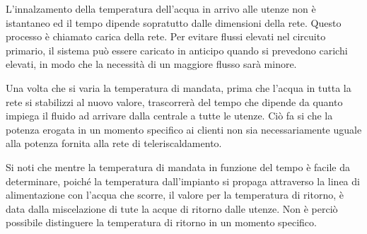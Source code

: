 \documentclass[laurea,oneside,11pt]{USiena_tesiLM3}
\begin{document}
L'innalzamento della temperatura dell'acqua in arrivo alle utenze non è istantaneo ed il tempo dipende sopratutto dalle dimensioni della rete. Questo processo è chiamato carica della rete. Per evitare flussi elevati nel circuito primario, il sistema può essere caricato in anticipo quando si prevedono carichi elevati, in modo che la necessità di un maggiore flusso sarà minore.

Una volta che si varia la temperatura di mandata, prima che l'acqua in tutta la rete si stabilizzi al nuovo valore, trascorrerà del tempo che dipende da quanto  impiega il fluido ad arrivare dalla centrale a tutte le utenze. Ciò fa si che la potenza erogata in un momento specifico ai clienti non sia necessariamente uguale alla potenza fornita alla rete di teleriscaldamento.

%

Si noti che mentre la temperatura di mandata in funzione del tempo è facile da determinare, poiché la temperatura dall'impianto si propaga attraverso la linea di alimentazione con l'acqua che scorre, il valore per la temperatura di ritorno, è data dalla miscelazione di tute la acque di ritorno dalle utenze. Non è perciò possibile distinguere la temperatura di ritorno in un momento specifico.
\end{document}

